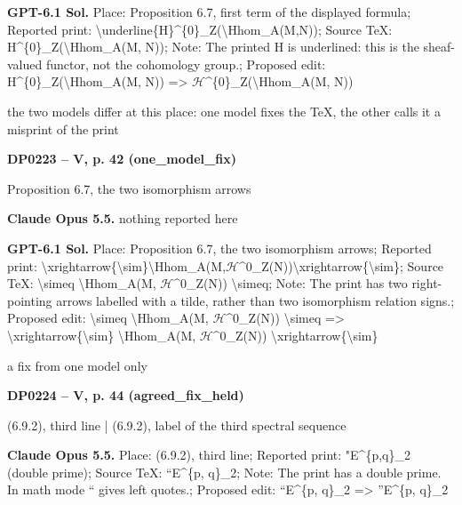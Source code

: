 \textbf{GPT-6.1 Sol.} Place: Proposition 6.7, first term of the displayed formula; Reported print: \textbackslash{}underline\{H\}\textasciicircum{}\{0\}\_Z(\textbackslash{}Hhom\_A(M,N)); Source TeX: H\textasciicircum{}\{0\}\_Z(\textbackslash{}Hhom\_A(M, N)); Note: The printed H is underlined: this is the sheaf-valued functor, not the cohomology group.; Proposed edit: H\textasciicircum{}\{0\}\_Z(\textbackslash{}Hhom\_A(M, N)) =\allowbreak > \ensuremath{\mathcal{H}}\textasciicircum{}\{0\}\_Z(\textbackslash{}Hhom\_A(M, N))\par
the two models differ at this place: one model fixes the TeX, the other calls it a misprint of the print\par
\par\noindent\hypertarget{DP0223}{}\textbf{DP0223 -- V, p. 42 (one\_model\_fix)}\par
Proposition 6.7, the two isomorphism arrows\par
\textbf{Claude Opus 5.5.} nothing reported here\par
\textbf{GPT-6.1 Sol.} Place: Proposition 6.7, the two isomorphism arrows; Reported print: \textbackslash{}xrightarrow\{\textbackslash{}sim\}\textbackslash{}Hhom\_A(M,\ensuremath{\mathcal{H}}\textasciicircum{}0\_Z(N))\textbackslash{}xrightarrow\{\textbackslash{}sim\}; Source TeX: \textbackslash{}simeq \textbackslash{}Hhom\_A(M, \ensuremath{\mathcal{H}}\textasciicircum{}0\_Z(N)) \textbackslash{}simeq; Note: The print has two right-pointing arrows labelled with a tilde, rather than two isomorphism relation signs.; Proposed edit: \textbackslash{}simeq \textbackslash{}Hhom\_A(M, \ensuremath{\mathcal{H}}\textasciicircum{}0\_Z(N)) \textbackslash{}simeq =\allowbreak > \textbackslash{}xrightarrow\{\textbackslash{}sim\} \textbackslash{}Hhom\_A(M, \ensuremath{\mathcal{H}}\textasciicircum{}0\_Z(N)) \textbackslash{}xrightarrow\{\textbackslash{}sim\}\par
a fix from one model only\par
\par\noindent\hypertarget{DP0224}{}\textbf{DP0224 -- V, p. 44 (agreed\_fix\_held)}\par
(6.9.2), third line | (6.9.2), label of the third spectral sequence\par
\textbf{Claude Opus 5.5.} Place: (6.9.2), third line; Reported print: "E\textasciicircum{}\{p,q\}\_2 (double prime); Source TeX: ``E\textasciicircum{}\{p, q\}\_2; Note: The print has a double prime. In math mode `` gives left quotes.; Proposed edit: ``E\textasciicircum{}\{p, q\}\_2 =\allowbreak > ''E\textasciicircum{}\{p, q\}\_2\par
